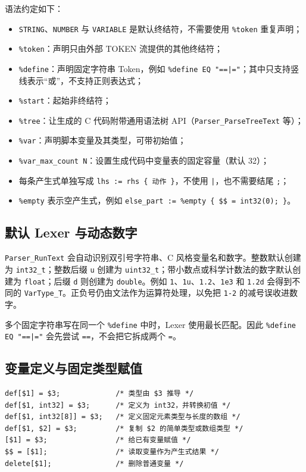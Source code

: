 语法约定如下：

\begin{itemize}
\item \texttt{STRING}、\texttt{NUMBER} 与 \texttt{VARIABLE} 是默认终结符，不需要使用 \texttt{\%token} 重复声明；
\item \texttt{\%token}：声明只由外部 TOKEN 流提供的其他终结符；
\item \texttt{\%define}：声明固定字符串 Token，例如 \texttt{\%define EQ "==|="}；其中只支持竖线表示“或”，不支持正则表达式；
\item \texttt{\%start}：起始非终结符；
\item \texttt{\%tree}：让生成的 C 代码附带通用语法树 API（\texttt{Parser\_ParseTreeText} 等）；
\item \texttt{\%var}：声明脚本变量及其类型，可带初始值；
\item \texttt{\%var\_max\_count N}：设置生成代码中变量表的固定容量（默认 32）；
\item 每条产生式单独写成 \texttt{lhs := rhs \{ 动作 \}}，不使用 \texttt{|}，也不需要结尾 \texttt{;}；
\item \texttt{\%empty} 表示空产生式，例如 \texttt{else\_part := \%empty \{ \$\$ = int32(0); \}}。
\end{itemize}

\subsection{默认 Lexer 与动态数字}

\texttt{Parser\_RunText} 会自动识别双引号字符串、C 风格变量名和数字。整数默认创建为 \texttt{int32\_t}；整数后缀 \texttt{u} 创建为 \texttt{uint32\_t}；带小数点或科学计数法的数字默认创建为 \texttt{float}；后缀 \texttt{d} 则创建为 \texttt{double}。例如 \texttt{1}、\texttt{1u}、\texttt{1.2}、\texttt{1e3} 和 \texttt{1.2d} 会得到不同的 \texttt{VarType\_T}。正负号仍由文法作为运算符处理，以免把 \texttt{1-2} 的减号误收进数字。

多个固定字符串写在同一个 \texttt{\%define} 中时，Lexer 使用最长匹配。因此 \texttt{\%define EQ "==|="} 会先尝试 \texttt{==}，不会把它拆成两个 \texttt{=}。

\subsection{变量定义与固定类型赋值}

\begin{lstlisting}
def[$1] = $3;             /* 类型由 $3 推导 */
def[$1, int32] = $3;      /* 定义为 int32，并转换初值 */
def[$1, int32[8]] = $3;   /* 定义固定元素类型与长度的数组 */
def[$1, $2] = $3;         /* 复制 $2 的简单类型或数组类型 */
[$1] = $3;                /* 给已有变量赋值 */
$$ = [$1];                /* 读取变量作为产生式结果 */
delete[$1];               /* 删除普通变量 */
\end{lstlisting}

